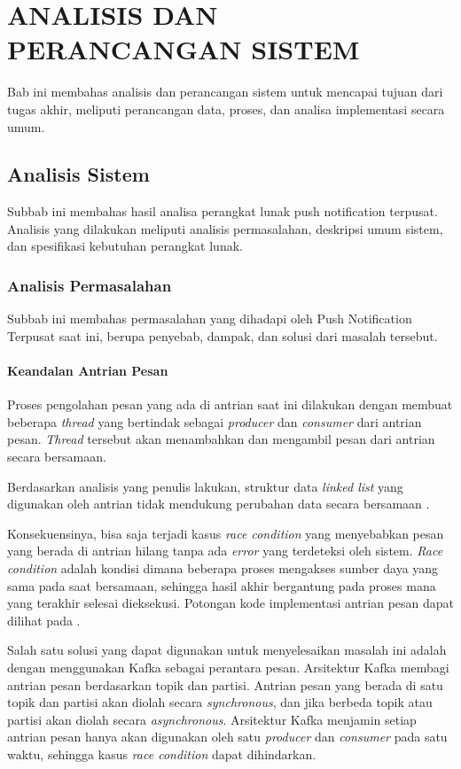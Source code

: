 \chapter{ANALISIS DAN PERANCANGAN SISTEM}
\par Bab ini membahas analisis dan perancangan sistem untuk mencapai tujuan dari tugas akhir, meliputi perancangan data, proses, dan analisa implementasi secara umum.

\section{Analisis Sistem}
\par Subbab ini membahas hasil analisa perangkat lunak push notification terpusat.
Analisis yang dilakukan meliputi analisis permasalahan, deskripsi umum sistem, dan spesifikasi kebutuhan perangkat lunak.

\subsection{Analisis Permasalahan}
\par Subbab ini membahas permasalahan yang dihadapi oleh Push Notification Terpusat saat ini, berupa penyebab, dampak, dan solusi dari masalah tersebut.

\subsubsection{Keandalan Antrian Pesan}
\par Proses pengolahan pesan yang ada di antrian saat ini dilakukan dengan membuat beberapa \textit{thread} yang bertindak sebagai \textit{producer} dan \textit{consumer} dari antrian pesan. \textit{Thread} tersebut akan menambahkan dan mengambil pesan dari antrian secara bersamaan.
\par Berdasarkan analisis yang penulis lakukan, struktur data \textit{linked list} yang digunakan oleh antrian tidak mendukung perubahan data secara bersamaan \cite{linkedlist-online}.
\par Konsekuensinya, bisa saja terjadi kasus \textit{race condition} yang menyebabkan pesan yang berada di antrian hilang tanpa ada \textit{error} yang terdeteksi oleh sistem. \textit{Race condition} adalah kondisi dimana beberapa proses mengakses sumber daya yang sama pada saat bersamaan, sehingga hasil akhir bergantung pada proses mana yang terakhir selesai dieksekusi. Potongan kode implementasi antrian pesan dapat dilihat pada .
\par Salah satu solusi yang dapat digunakan untuk menyelesaikan masalah ini adalah dengan menggunakan Kafka sebagai perantara pesan. Arsitektur Kafka membagi antrian pesan berdasarkan topik dan partisi. Antrian pesan yang berada di satu topik dan partisi akan diolah secara \textit{synchronous}, dan jika berbeda topik atau partisi akan diolah secara \textit{asynchronous}. Arsitektur Kafka menjamin setiap antrian pesan hanya akan digunakan oleh satu \textit{producer} dan \textit{consumer} pada satu waktu, sehingga kasus \textit{race condition} dapat dihindarkan.

